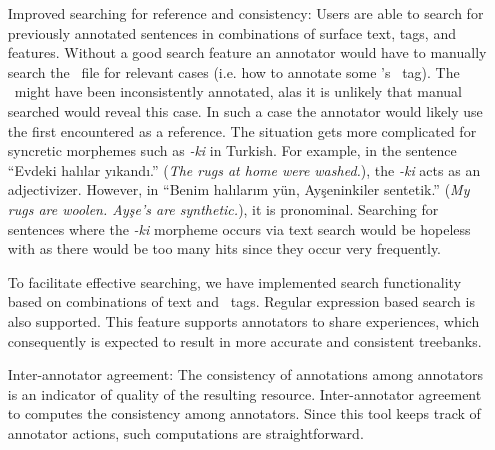 \begin{itemize}[before=\normalfont, font=\itshape, align=left,noitemsep,topsep=0pt,parsep=0pt,partopsep=0pt,labelwidth=5cm,align=left,itemindent=5cm]
    \item[Improved searching for reference and consistency:]
        Users are able to search for previously annotated sentences in combinations of surface text, tags, and features. 
		Without a good search feature an annotator would have to manually search the \conllu\ file for relevant cases (i.e. how to annotate some \form's \upos\ tag).
		The \form\ might have been inconsistently annotated, alas it is unlikely that manual searched would reveal this case. 
		In such a case the annotator would likely use the first encountered as a reference. 
        The situation gets more complicated for syncretic morphemes such as \textit{-ki} in Turkish.
        For example, in the sentence ``Evdeki halılar yıkandı.'' (\textit{The rugs at home were washed.}), the \textit{-ki} acts as an adjectivizer.
        However, in ``Benim halılarım yün, Ayşeninkiler sentetik.'' (\textit{My rugs are woolen. Ayşe's are synthetic.}), it is pronominal.
        Searching for sentences where the \textit{-ki} morpheme occurs via text search would be hopeless with as there would be too many hits since they occur very frequently.

        To facilitate effective searching, we have implemented search functionality based on combinations of text and \ud\ tags.
        Regular expression based search is also supported.
        This feature supports annotators to share experiences, which consequently is expected to result in more accurate and consistent treebanks.
        
    \item[Inter-annotator agreement:]
        The consistency of annotations among annotators is an indicator of quality of the resulting resource.
        Inter-annotator agreement to computes the consistency among annotators.
        Since this tool keeps track of annotator actions, such computations are straightforward.

\end{itemize}
